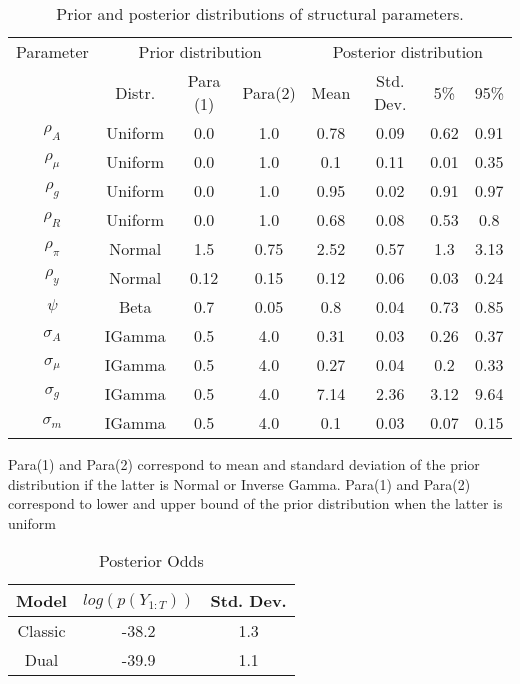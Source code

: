 \begin{table}[H]
\begin{center}
\caption{Prior and posterior distributions of structural parameters.}
\begin{tabular}{cccccccc}
\toprule
Parameter & \multicolumn{3}{c}{Prior distribution} & \multicolumn{4}{c}{Posterior distribution} \\ \cmidrule{2-4} \cmidrule{5-8} & Distr. & Para (1) & Para(2) & Mean  & Std. Dev. & 5\%   & 95\% \\ \midrule
$\rho_{A}$ & Uniform & 0.0 & 1.0 & 0.78 & 0.09 & 0.62 & 0.91 \\
$\rho_\mu$ & Uniform & 0.0 & 1.0 & 0.1 & 0.11 & 0.01 & 0.35 \\
$\rho_g$ & Uniform & 0.0 & 1.0 & 0.95 & 0.02 & 0.91 & 0.97 \\
$\rho_R$ & Uniform & 0.0 & 1.0 & 0.68 & 0.08 & 0.53 & 0.8 \\
$\rho_\pi$ & Normal & 1.5 & 0.75 & 2.52 & 0.57 & 1.3 & 3.13 \\
$\rho_y$ & Normal & 0.12 & 0.15 & 0.12 & 0.06 & 0.03 & 0.24 \\
$\psi$ & Beta & 0.7 & 0.05 & 0.8 & 0.04 & 0.73 & 0.85 \\
$\sigma_A$ & IGamma & 0.5 & 4.0 & 0.31 & 0.03 & 0.26 & 0.37 \\
$\sigma_\mu$ & IGamma & 0.5 & 4.0 & 0.27 & 0.04 & 0.2 & 0.33 \\
$\sigma_g$ & IGamma & 0.5 & 4.0 & 7.14 & 2.36 & 3.12 & 9.64 \\
$\sigma_m$ & IGamma & 0.5 & 4.0 & 0.1 & 0.03 & 0.07 & 0.15 \\
\bottomrule
\end{tabular}
\end{center}
\label{estimates_classic}
\begin{flushleft}
\footnotesize{Para(1) and Para(2) correspond to mean and standard deviation of the prior distribution if the latter is Normal or Inverse Gamma. Para(1) and Para(2) correspond to lower and upper bound of the prior distribution when the latter is uniform}
\end{flushleft}
\end{table}

\begin{table}[H]
  \centering
  \caption{Posterior Odds}
    \begin{tabular}{ccc}
    \toprule
    Model & $log \left( p \left( Y_{1:T} \right) \right)$ & Std. Dev. \\
    \midrule
    Classic & -38.2 & 1.3 \\
    Dual & -39.9 & 1.1 \\
    \bottomrule
    \end{tabular}%
  \label{PostOdds}%
\end{table}%